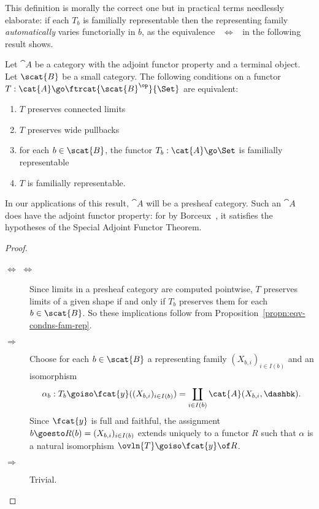 This definition is morally the correct one but in practical terms
needlessly elaborate: if each $T_b$ is familially representable then the
representing family \emph{automatically} varies functorially in $b$, as the
equivalence~
$\Leftrightarrow$~ in the following result
shows.
%
\begin{propn}	
Let $\cat{A}$ be a category with the adjoint functor property and a
terminal object.  Let $\scat{B}$ be a small category.  The following
conditions on a functor $T: \cat{A} \go \ftrcat{\scat{B}^\op}{\Set}$ are
equivalent: 
%
\begin{enumerate}
\item	{}
$T$ preserves connected limits
\item	{}
$T$ preserves wide pullbacks
\item	{}
for each $b\in \scat{B}$, the functor $T_b: \cat{A} \go \Set$ is familially
representable 
\item 	{}
$T$ is familially representable.
\end{enumerate}
\end{propn}
%
In our applications of this result, $\cat{A}$ will be a presheaf category.
Such an $\cat{A}$ does have the adjoint functor property: for by
Borceux~\cite[4.7.2]{Borx1}, it satisfies the hypotheses of the Special
Adjoint Functor Theorem.
%
\begin{proof}
%
\begin{description}
\item[ $\Leftrightarrow$
 $\Leftrightarrow$
] 
Since limits in a presheaf category are computed pointwise, $T$ preserves
limits of a given shape if and only if $T_b$ preserves them for each
$b\in\scat{B}$.  So these implications follow from
Proposition~\ref{propn:eqv-condns-fam-rep}.
\item[ $\Rightarrow$ ]
Choose for each $b\in \scat{B}$ a representing family $(X_{b,i})_{i\in
I(b)}$ and an isomorphism
\[
\alpha_b: T_b 
\goiso 
\fcat{y}((X_{b,i})_{i\in I(b)}) = 
\coprod_{i\in I(b)} \cat{A}(X_{b,i}, \dashbk).
\]
Since $\fcat{y}$ is full and faithful, the assignment $b \goesto R(b) = 
(X_{b,i})_{i\in I(b)}$ extends uniquely to a functor $R$ such that
$\alpha$ is a natural isomorphism $\ovln{T} \goiso \fcat{y} \of R$.  
\item[ $\Rightarrow$
] 
Trivial.
\done
\end{description}
\end{proof}

